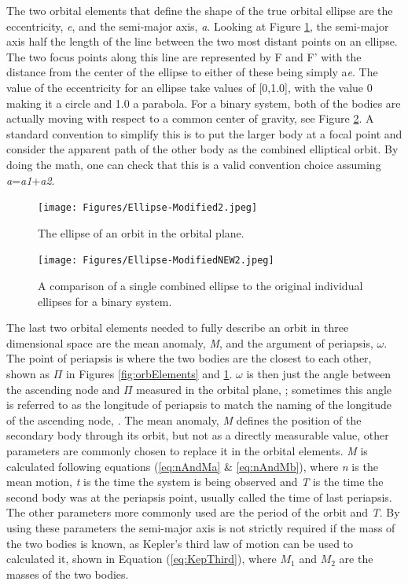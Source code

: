 \documentclass[12pt,preprint]{aastex}
\begin{document}
The two orbital elements that define the shape of the true orbital ellipse are the eccentricity, {\it e}, and the semi-major axis, {\it a}.  Looking at Figure \ref{fig:orbEllipse}, the semi-major axis half the length of the line between the two most distant points on an ellipse.  The two focus points along this line are represented by F and F' with the distance from the center of the ellipse to either of these being simply a{\it e}.  The value of the eccentricity for an ellipse take values of [0,1.0], with the value 0 making it a circle and 1.0 a parabola.  For a binary system, both of the bodies are actually moving with respect to a common center of gravity, see Figure \ref{fig:ellipseComparison}.  A standard convention to simplify this is to put the larger body at a focal point and consider the apparent path of the other body as the combined elliptical orbit.  By doing the math, one can check that this is a valid convention choice assuming {\it a}={\it a1}+{\it a2}.  


\begin{figure}[h]
\begin{center}
\texttt{[image: Figures/Ellipse-Modified2.jpeg]}
\caption[Orbital Ellipse]{ The ellipse of an orbit in the orbital plane. }
\label{fig:orbEllipse}
\end{center}
\end{figure}

\begin{figure}[h]
\begin{center}
\texttt{[image: Figures/Ellipse-ModifiedNEW2.jpeg]}
\caption[Single vs Dual Orbital Ellipses]{ A comparison of a single combined ellipse to the original individual ellipses for a binary system.}
\label{fig:ellipseComparison}
\end{center}
\end{figure}

The last two orbital elements needed to fully describe an orbit in three dimensional space are the mean anomaly, {\it M}, and the argument of periapsis, $\omega$.  The point of periapsis is where the two bodies are the closest to each other, shown as $\Pi$ in Figures \ref{fig:orbElements} and \ref{fig:orbEllipse}.  $\omega$ is then just the angle between the ascending node and $\Pi$ measured in the orbital plane, \citep{heintz}; sometimes this angle is referred to as the longitude of periapsis to match the naming of the longitude of the ascending node, \citep{hilditch}.  The mean anomaly, {\it M} defines the position of the secondary body through its orbit, but not as a directly measurable value, other parameters are commonly chosen to replace it in the orbital elements.  {\it M} is calculated following equations (\ref{eq:nAndMa} \& \ref{eq:nAndMb}), where {\it n} is the mean motion, {\it t} is the time the system is being observed and {\it T} is the time the second body was at the periapsis point, usually called the time of last periapsis.  The other parameters more commonly used are the period of the orbit and {\it T}.  By using these parameters the semi-major axis is not strictly required if the mass of the two bodies is known, as Kepler's third law of motion can be used to calculated it, shown in Equation (\ref{eq:KepThird}), where $M_1$ and $M_2$ are the masses of the two bodies.
\end{document}
